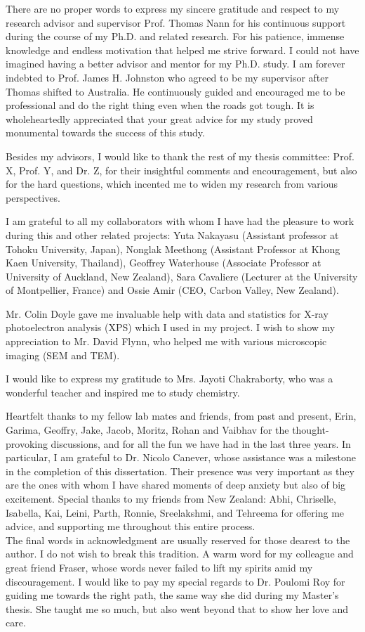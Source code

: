 \documentclass[
11pt, %
oneside, %
english, %
onehalfspacing, %
nolistspacing, %
liststotoc, %
headsepline, %
consistentlayout, %
]{name} %
\begin{document}
\begin{acknowledgements}
\addchaptertocentry{\acknowledgementname} 
There are no proper words to express my sincere gratitude and respect to my research advisor and supervisor Prof. Thomas Nann for his continuous support during the course of my Ph.D. and related research. For his patience, immense knowledge and endless motivation that helped me strive forward. I could not have imagined having a better advisor and mentor for my Ph.D. study.
I am forever indebted to Prof. James H. Johnston who agreed to be my supervisor after Thomas shifted to Australia. He continuously guided and encouraged me to be professional and do the right thing even when the roads got tough. It is wholeheartedly appreciated that your great advice for my study proved monumental towards the success of this study. 

Besides my advisors, I would like to thank the rest of my thesis committee: Prof. X, Prof. Y, and Dr. Z, for their insightful comments and encouragement, but also for the hard questions, which incented me to widen my research from various perspectives.

I am grateful to all my collaborators with whom I have had the pleasure to work during this and other related projects: Yuta Nakayasu (Assistant professor at Tohoku University, Japan), Nonglak Meethong (Assistant Professor at Khong Kaen University, Thailand), Geoffrey Waterhouse (Associate Professor at University of Auckland, New Zealand), Sara Cavaliere (Lecturer at the University of Montpellier, France) and Ossie Amir (CEO, Carbon Valley, New Zealand).

Mr. Colin Doyle gave me invaluable help with data and statistics for X-ray photoelectron analysis (XPS) which I used in my project. I wish to show my appreciation to Mr. David Flynn, who helped me with various microscopic imaging (SEM and TEM).

I would like to express my gratitude to Mrs. Jayoti Chakraborty, who was a wonderful teacher and inspired me to study chemistry.

Heartfelt thanks to my fellow lab mates and friends, from past and present, Erin, Garima, Geoffry, Jake, Jacob, Moritz, Rohan and Vaibhav for the thought-provoking discussions, and for all the fun we have had in the last three years. In particular, I am grateful to Dr. Nicolo Canever, whose assistance was a milestone in the completion of this dissertation. Their presence was very important as they are the ones with whom I have shared moments of deep anxiety but also of big excitement. Special thanks to my friends from New Zealand: Abhi, Chriselle, Isabella, Kai, Leini, Parth, Ronnie, Sreelakshmi, and Tehreema for offering me advice, and supporting me throughout this entire process. \\
The final words in acknowledgment are usually reserved for those dearest to the author. I do not wish to break this tradition. A warm word for my colleague and great friend Fraser, whose words never failed to lift my spirits amid my discouragement. I would like to pay my special regards to Dr. Poulomi Roy for guiding me towards the right path, the same way she did during my Master's thesis. She taught me so much, but also went beyond that to show her love and care. 


\end{acknowledgements}
\end{document}
